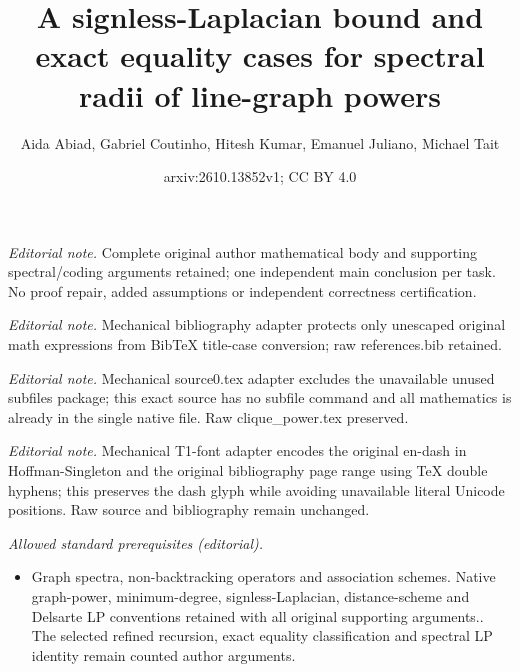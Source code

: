 \documentclass[10pt,a4paper]{article}
\title{A signless-Laplacian bound and exact equality cases for spectral radii of line-graph powers}
\author{Aida Abiad, Gabriel Coutinho, Hitesh Kumar, Emanuel Juliano, Michael Tait}
\date{arxiv:2610.13852v1; CC BY 4.0}
\theoremstyle{plain}
\numberwithin{equation}{section}
\begin{document}
\maketitle
\noindent\textit{Editorial note.} Complete original author mathematical body and supporting spectral/coding arguments retained; one independent main conclusion per task. No proof repair, added assumptions or independent correctness certification.\par\medskip
\noindent\textit{Editorial note.} Mechanical bibliography adapter protects only unescaped original math expressions from BibTeX title-case conversion; raw references.bib retained.\par\medskip
\noindent\textit{Editorial note.} Mechanical source0.tex adapter excludes the unavailable unused subfiles package; this exact source has no subfile command and all mathematics is already in the single native file. Raw clique\_power.tex preserved.\par\medskip
\noindent\textit{Editorial note.} Mechanical T1-font adapter encodes the original en-dash in Hoffman-Singleton and the original bibliography page range using TeX double hyphens; this preserves the dash glyph while avoiding unavailable literal Unicode positions. Raw source and bibliography remain unchanged.\par\medskip
\noindent\textit{Allowed standard prerequisites (editorial).}\begin{itemize}
\item Graph spectra, non-backtracking operators and association schemes. Native graph-power, minimum-degree, signless-Laplacian, distance-scheme and Delsarte LP conventions retained with all original supporting arguments.. The selected refined recursion, exact equality classification and spectral LP identity remain counted author arguments.
\end{itemize}\medskip
\end{document}
